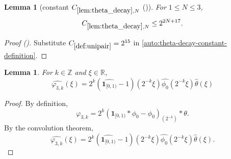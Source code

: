 \documentclass[12pt,reqno]{amsart}
\newcommand{\auto}{{({\tiny\faCar})}}
\theoremstyle{plain}
\newtheorem{lemma}[theorem]{Lemma}
\numberwithin{equation}{section}
\theoremstyle{remark}
\newcommand{\uses}[1]{}
\newcommand{\usesdefs}[1]{}
\begin{document}
\begin{lemma}[constant $C_{\ref{lem:theta_decay},N}$ \auto]\label{constant theta decay}\uses{lem:theta_decay}\usesdefs{def:unipair}
For $1\le N\le3$,
\begin{equation}\label{constant theta decay bound}
C_{\ref{lem:theta_decay},N}\le2^{2N+17}.
\end{equation}
\end{lemma}
\begin{proof}[Proof \auto]
Substitute $C_{\ref{def:unipair}}=2^{15}$ in \eqref{auto:theta-decay-constant-definition}.
\end{proof}


\begin{lemma}\label{lem:ft_phi3_eq}\uses{}\usesdefs{defn:window based bump functions}
For $k\in\mathbb{Z}$ and $\xi\in\mathbb{R}$,
\begin{equation}\label{auto:varphi-three-Fourier-transform} \widehat{\varphi_{3,k}}(\xi) = 2^k(\widehat{\mathbf{1}_{[0,1)}}-1)(2^{-k}\xi)\widehat{\phi_0}(2^{-k}\xi)\widehat{\theta}(\xi) \end{equation}
\end{lemma}

\begin{proof}
By definition,
\[\varphi_{3,k} = 2^k (\mathbf{1}_{[0,1)} * \phi_0 - \phi_0)_{(2^{-k}) }*\theta.\]
By the convolution theorem,
\[\widehat{\varphi_{3,k}}(\xi) = 2^k(\widehat{\mathbf{1}_{[0,1)}}-1)(2^{-k}\xi)\widehat{\phi_0}(2^{-k}\xi)\widehat{\theta}(\xi).\]
\end{proof}
\end{document}
